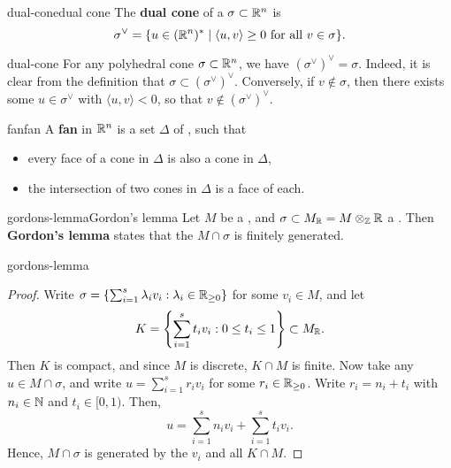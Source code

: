 \begin{topic}{dual-cone}{dual cone}
    The \textbf{dual cone} of a  $\sigma \subset \mathbb{R}^n$ is
    \[ \sigma^\vee = \{ u \in (\mathbb{R}^n)^* \mid \langle u, v \rangle \ge 0 \text{ for all } v \in \sigma \} . \]
\end{topic}

\begin{example}{dual-cone}
    For any polyhedral cone $\sigma \subset \mathbb{R}^n$, we have $(\sigma^\vee)^\vee = \sigma$. Indeed, it is clear from the definition that $\sigma \subset (\sigma^\vee)^\vee$. Conversely, if $v \not\in \sigma$, then there exists some $u \in \sigma^\vee$ with $\langle u, v \rangle < 0$, so that $v \not\in (\sigma^\vee)^\vee$.
\end{example}

\begin{topic}{fan}{fan}
    A \textbf{fan} in $\mathbb{R}^n$ is a set $\Delta$ of , such that
    \begin{itemize}
        \item every face of a cone in $\Delta$ is also a cone in $\Delta$,
        \item the intersection of two cones in $\Delta$ is a face of each.
    \end{itemize}
\end{topic}

\begin{topic}{gordons-lemma}{Gordon's lemma}
    Let $M$ be a  , and $\sigma \subset M_{\mathbb{R}} = M \otimes_{\mathbb{Z}} \mathbb{R}$ a . Then \textbf{Gordon's lemma} states that the  $M \cap \sigma$ is finitely generated.
\end{topic}

\begin{example}{gordons-lemma}
    \begin{proof}
        Write $\sigma = \left\{ \sum_{i = 1}^{s} \lambda_i v_i : \lambda_i \in \mathbb{R}_{\ge 0} \right\}$ for some $v_i \in M$, and let
        \[ K = \left\{ \sum_{i = 1}^{s} t_i v_i : 0 \le t_i \le 1 \right\} \subset M_{\mathbb{R}} . \]
        Then $K$ is compact, and since $M$ is discrete, $K \cap M$ is finite. Now take any $u \in M \cap \sigma$, and write $u = \sum_{i = 1}^{s} r_i v_i$ for some $r_i \in \mathbb{R}_{\ge 0}$. Write $r_i = n_i + t_i$ with $n_i \in \mathbb{N}$ and $t_i \in [0, 1)$. Then,
        \[ u = \sum_{i = 1}^{s} n_i v_i + \sum_{i = 1}^{s} t_i v_i . \]
        Hence, $M \cap \sigma$ is generated by the $v_i$ and all $K \cap M$.
    \end{proof}
\end{example}

